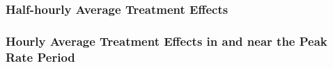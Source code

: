 \subsubsection{Half-hourly Average Treatment Effects}
\label{Sub-subsection:Half-hourly-Average-Treatment-Effects}



\subsubsection{Hourly Average Treatment Effects in and near the Peak Rate Period}
\label{Sub-subsection:Hourly-Average-Treatment-Effects-in-and-near-the-Peak-Rate-Period}
